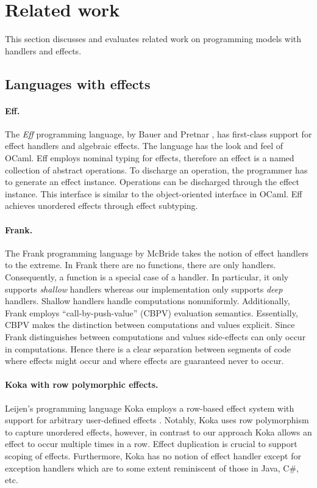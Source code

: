 \section{Related work}\label{sec:relatedwork}
This section discusses and evaluates related work on programming models with handlers and effects.

\subsection{Languages with effects}
\paragraph{Eff.} The \emph{Eff} programming language, by Bauer and Pretnar \cite{Bauer2015}, has first-class support for effect handlers and algebraic effects. The language has the look and feel of OCaml. Eff employs nominal typing for effects, therefore an effect is a named collection of abstract operations. To discharge an operation, the programmer has to generate an effect instance. Operations can be discharged through the effect instance. This interface is similar to the object-oriented interface in OCaml. 
Eff achieves unordered effects through effect subtyping. 

\paragraph{Frank.} The Frank programming language by McBride \cite{McBride2014} takes the notion of effect handlers to the extreme. In Frank there are no functions, there are only handlers. Consequently, a function is a special case of a handler.
In particular, it only supports \emph{shallow} handlers whereas our implementation only supports \emph{deep} handlers. Shallow handlers handle computations nonuniformly. Additionally, Frank employs ``call-by-push-value'' (CBPV) evaluation semantics. Essentially, CBPV makes the distinction between computations and values explicit. Since Frank distinguishes between computations and values side-effects can only occur in computations. Hence there is a clear separation between segments of code where effects might occur and where effects are guaranteed never to occur.

\paragraph{Koka with row polymorphic effects.}
Leijen's programming language Koka employs a row-based effect system \cite{Leijen2014} with support for arbitrary user-defined effects \cite{Vazou2015}.
Notably, Koka uses row polymorphism to capture unordered effects, however, in contrast to our approach Koka allows an effect to occur multiple times in a row. Effect duplication is crucial to support scoping of effects.
Furthermore, Koka has no notion of effect handler except for exception handlers which are to some extent reminiscent of those in Java, C\#, etc.


